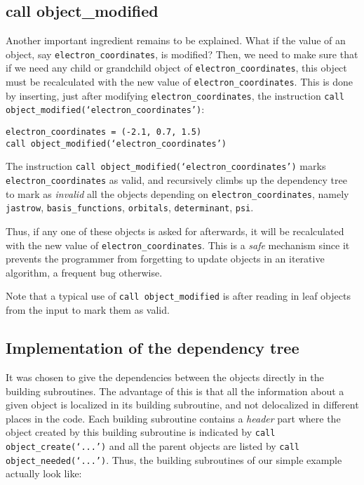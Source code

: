 \documentclass[a4paper,11pt]{article}
\begin{document}
\subsection{call object\_modified}
Another important ingredient remains to be explained. What if the value of an object, say {\tt electron\_coordinates}, is modified? Then, we need to make sure that if we need any child or grandchild object of {\tt electron\_coordinates}, this object must be recalculated with the new value of {\tt electron\_coordinates}. This is done by inserting, just after modifying {\tt electron\_coordinates}, the instruction {\tt call object\_modified(`electron\_coordinates')}:

\vspace{0.5cm}
\noindent
{\tt electron\_coordinates = (-2.1, 0.7, 1.5)\\
call object\_modified(`electron\_coordinates')
}

\vspace{0.5cm}
The instruction {\tt call object\_modified(`electron\_coordinates')} marks {\tt electron\_coordinates} as valid, and recursively climbs up the dependency tree to mark as {\it invalid} all the objects depending on {\tt electron\_coordinates}, namely {\tt jastrow},  {\tt basis\_functions}, {\tt orbitals}, {\tt determinant}, {\tt psi}. 

Thus, if any one of these objects is asked for afterwards, it will be recalculated with the new value of {\tt electron\_coordinates}. This is a {\it safe} mechanism since it prevents the programmer from forgetting to update objects in an iterative algorithm, a frequent bug otherwise.

Note that a typical use of {\tt call object\_modified} is after reading in leaf objects from the input to mark them as valid.

\subsection{Implementation of the dependency tree}

It was chosen to give the dependencies between the objects directly in the building subroutines. The advantage of this is that all the information about a given object is localized in its building subroutine, and not delocalized in different places in the code. Each building subroutine contains a {\it header} part where the object created by this building subroutine is indicated by {\tt call object\_create(`...')} and all the parent objects are listed by {\tt call object\_needed(`...')}. Thus, the building subroutines of our simple example actually look like:
\end{document}
